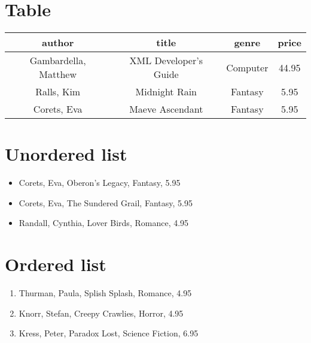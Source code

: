 \documentclass{article}
\begin{document}
\section{Table}
\begin{center}
\begin{tabular}{|c|c|c|c|}
\hline
author & title & genre & price \\ \hline \hline
Gambardella, Matthew & XML Developer's Guide & Computer & 44.95 \\ \hline
Ralls, Kim & Midnight Rain & Fantasy & 5.95 \\ \hline
Corets, Eva & Maeve Ascendant & Fantasy & 5.95 \\ \hline
\end{tabular}
\end{center}
\section{Unordered list}
\begin{itemize}
\item Corets, Eva, Oberon's Legacy, Fantasy, 5.95
\item Corets, Eva, The Sundered Grail, Fantasy, 5.95
\item Randall, Cynthia, Lover Birds, Romance, 4.95
\end{itemize}
\section{Ordered list}
\begin{enumerate}
\item Thurman, Paula, Splish Splash, Romance, 4.95
\item Knorr, Stefan, Creepy Crawlies, Horror, 4.95
\item Kress, Peter, Paradox Lost, Science Fiction, 6.95
\end{enumerate}
\end{document}
